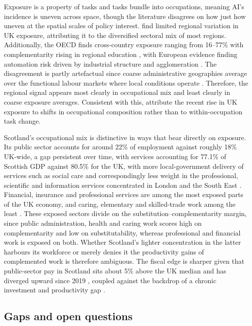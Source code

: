 Exposure is a property of tasks and tasks bundle into occupations, meaning AI's incidence is uneven across space, though the literature disagrees on how just how uneven at the spatial scales of policy interest. \citet{tbi2024} find limited regional variation in UK exposure, attributing it to the diversified sectoral mix of most regions. Additionally, the OECD finds cross-country exposure ranging from 16--77\% with complementarity rising in regional education \citep{oecd2024}, with European evidence finding automation risk driven by industrial structure and agglomeration \citep{crowley2021}. The disagreement is partly artefactual since coarse administrative geographies average over the functional labour markets where local conditions operate \citep{overman2022}. Therefore, the regional signal appears most clearly in occupational mix and least clearly in coarse exposure averages. Consistent with this, \citet{henseke2025} attribute the recent rise in UK exposure to shifts in occupational composition rather than to within-occupation task change.

Scotland's occupational mix is distinctive in ways that bear directly on exposure.
Its public sector accounts for around 22\% of employment against roughly 18\% UK-wide, a gap persistent over time, with services accounting for 77.1\% of Scottish GDP against 80.5\% for the UK, with more local-government delivery of services such as social care and correspondingly less weight in the professional, scientific and information services concentrated in London and the South East \citep{scotgov2024, commonslibrary2024}. Financial, insurance and professional services are among the most exposed parts of the UK economy, and caring, elementary and skilled-trade work among the least \citep{obr2025}. These exposed sectors divide on the substitution--complementarity margin, since public administration, health and caring work scores high on complementarity and low on substitutability, whereas professional and financial work is exposed on both. Whether Scotland's lighter concentration in the latter harbours its workforce or merely denies it the productivity gains of complemented work is therefore ambiguous. The fiscal edge is sharper given that public-sector pay in Scotland sits about 5\% above the UK median and has diverged upward since 2019 \citep{cribb2025}, coupled against the backdrop of a chronic investment and productivity gap \citep{williams2025}.

\subsection*{Gaps and open questions}


